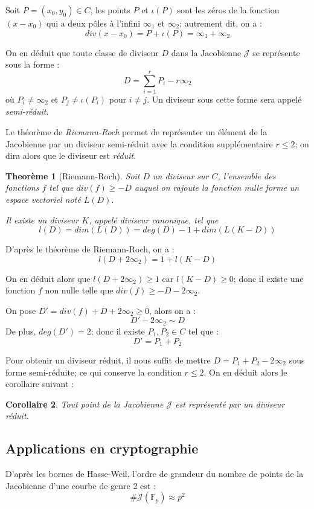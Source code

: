 \documentclass[a4paper,12pt]{article}
\newtheorem{theoreme}{Theorème}[section]
\newtheorem{corollaire}[theoreme]{Corollaire}
\theoremstyle{definition}
\theoremstyle{remark}
\numberwithin{equation}{section}
\begin{document}
Soit $P=(x_0,y_0) \in C$, les points $P$ et $\iota(P)$ sont les zéros de la fonction $(x-x_0)$ qui a deux pôles à l'infini $\infty_1$ et $\infty_2$; autrement dit, on a :
$$div(x-x_0) = P + \iota(P) = \infty_1 + \infty_2$$

On en déduit que toute classe de diviseur $D$ dans la Jacobienne $\mathcal{J}$ se représente sous la forme :
$$D = \sum_{i=1}^r{P_i} - r\infty_2$$
où $P_i \neq \infty_2$ et $P_j \neq \iota(P_i)$ pour $i \neq j$. Un diviseur sous cette forme sera appelé \emph{semi-réduit}.

Le théorème de \emph{Riemann-Roch} permet de représenter un élément de la Jacobienne par un diviseur semi-réduit avec la condition supplémentaire $r \leq 2$; on dira alors que le diviseur est \emph{réduit}.
\begin{theoreme}[Riemann-Roch]
Soit $D$ un diviseur sur $C$, l'ensemble des fonctions $f$ tel que $div(f) \geq -D$ auquel on rajoute la fonction nulle forme un espace vectoriel noté $L(D)$.

Il existe un diviseur $K$, appelé diviseur canonique, tel que
$$l(D) = dim (L(D)) = deg(D) - 1 + dim (L(K - D))$$
\end{theoreme}

D'après le théorème de Riemann-Roch, on a :
$$l(D+2\infty_2) = 1 + l(K-D)$$

On en déduit alors que $l(D+2\infty_2) \geq 1$ car $l(K-D) \geq 0$; donc il existe une fonction $f$ non nulle telle que $div(f) \geq -D - 2\infty_2$.

On pose $D' = div(f) + D + 2\infty_2 \geq 0$, alors on a :
$$D' - 2\infty_2 \sim D$$
De plus, $deg(D') = 2$; donc il existe $P_1, P_2 \in C$ tel que :
$$D' = P_1 + P_2$$

Pour obtenir un diviseur réduit, il nous suffit de mettre $D = P_1 + P_2 - 2\infty_2$ sous forme semi-réduite; ce qui conserve la condition $r \leq 2$. On en déduit alors le corollaire suivant :

\begin{corollaire}
\label{div_red}
Tout point de la Jacobienne $\mathcal{J}$ est représenté par un diviseur réduit.
\end{corollaire}

\subsection{Applications en cryptographie}
D'après les bornes de Hasse-Weil, l'ordre de grandeur du nombre de points de la Jacobienne d'une courbe de genre 2 est :
$$\#\mathcal{J}(\mathbb{F}_p) \approx p^2$$
\end{document}

